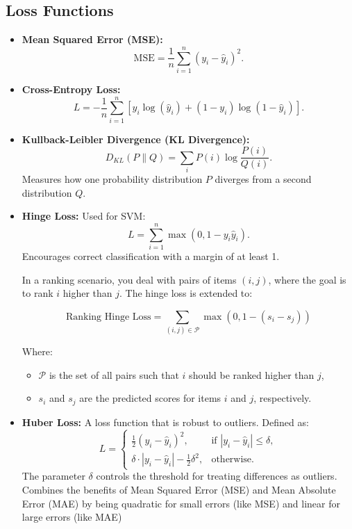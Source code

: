 \documentclass[12pt,a4paper]{article}
\begin{document}
\subsection{Loss Functions}
\begin{itemize}
    \item \textbf{Mean Squared Error (MSE):}
    \[ \text{MSE} = \frac{1}{n} \sum_{i=1}^n (y_i - \hat{y}_i)^2. \]
    \item \textbf{Cross-Entropy Loss:}
    \[ L = -\frac{1}{n} \sum_{i=1}^n \left[ y_i \log(\hat{y}_i) + (1 - y_i) \log(1 - \hat{y}_i) \right]. \]
    \item \textbf{Kullback-Leibler Divergence (KL Divergence):}
    \[ D_{KL}(P \| Q) = \sum_i P(i) \log\frac{P(i)}{Q(i)}. \]
    Measures how one probability distribution \(P\) diverges from a second distribution \(Q\).

\item \textbf{Hinge Loss:} Used for SVM:
    \[ L = \sum_{i=1}^n \max(0, 1 - y_i \hat{y}_i). \]
    Encourages correct classification with a margin of at least 1.
    
    In a ranking scenario, you deal with pairs of items \( (i, j) \), where the goal is to rank \( i \) higher than \( j \). The hinge loss is extended to:

\[
\text{Ranking Hinge Loss} = \sum_{(i, j) \in \mathcal{P}} \max(0, 1 - (s_i - s_j))
\]

Where:
\begin{itemize}
    \item \( \mathcal{P} \) is the set of all pairs such that \( i \) should be ranked higher than \( j \),
    \item \( s_i \) and \( s_j \) are the predicted scores for items \( i \) and \( j \), respectively.
\end{itemize}

\item \textbf{Huber Loss:} A loss function that is robust to outliers. Defined as:
    \[
    L = 
    \begin{cases} 
    \frac{1}{2}(y_i - \hat{y}_i)^2, & \text{if } |y_i - \hat{y}_i| \leq \delta, \\
    \delta \cdot |y_i - \hat{y}_i| - \frac{1}{2}\delta^2, & \text{otherwise}.
    \end{cases}
    \]
    The parameter \(\delta\) controls the threshold for treating differences as outliers. Combines the benefits of Mean Squared Error (MSE) and Mean Absolute Error (MAE) by being quadratic for small errors (like MSE) and linear for large errors (like MAE)


\end{itemize}
\end{document}
